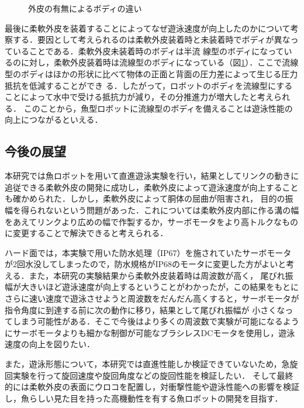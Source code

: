 \begin{figure}[t]
    \centering
    \caption{外皮の有無によるボディの違い}
    \label{fig:body}
\end{figure}

最後に柔軟外皮を装着することによってなぜ遊泳速度が向上したのかについて考察する．要因として考えられるのは柔軟外皮装着時と未装着時でボディが異なっていることである．柔軟外皮未装着時のボディは半流
線型のボディになっているのに対し，柔軟外皮装着時は流線型のボディになっている（図\ref{fig:body}）．ここで流線型のボディはほかの形状に比べて物体の正面と背面の圧力差によって生じる圧力抵抗を低減することができ
る．したがって，ロボットのボディを流線型にすることによって水中で受ける抵抗力が減り，その分推進力が増大したと考えられる．
このことから，魚型ロボットに流線型のボディを備えることは遊泳性能の向上につながるといえる．

\subsection{今後の展望}
本研究では魚ロボットを用いて直進遊泳実験を行い，結果としてリンクの動きに追従できる柔軟外皮の開発に成功し，柔軟外皮によって遊泳速度が向上することも確かめられた．しかし，柔軟外皮によって胴体の屈曲が阻害され，
目的の振幅を得られないという問題があった．これについては柔軟外皮内部に作る溝の幅をあえてリンクより広めの幅で作製するか，サーボモータをより高トルクなものに変更することで解決できると考えられる．

ハード面では，本実験で用いた防水処理（IP67）を施されていたサーボモータが2回水没してしまったので，防水規格がIP68のモータに変更した方がよいと考える．また，本研究の実験結果から柔軟外皮装着時は周波数が高く，
尾びれ振幅が大きいほど遊泳速度が向上するということがわかったが，この結果をもとにさらに速い速度で遊泳させようと周波数をだんだん高くすると，サーボモータが指令角度に到達する前に次の動作に移り，結果として尾びれ振幅が
小さくなってしまう可能性がある．そこで今後はより多くの周波数で実験が可能になるようにサーボモータよりも細かな制御が可能なブラシレスDCモータを使用し，遊泳速度の向上を図りたい．

また，遊泳形態について，本研究では直進性能しか検証できていないため，急旋回実験を行って旋回速度や旋回角度などの旋回性能を検証したい．
そして最終的には柔軟外皮の表面にウロコを配置し，対衝撃性能や遊泳性能への影響を検証し，魚らしい見た目を持った高機動性を有する魚ロボットの開発を目指す．